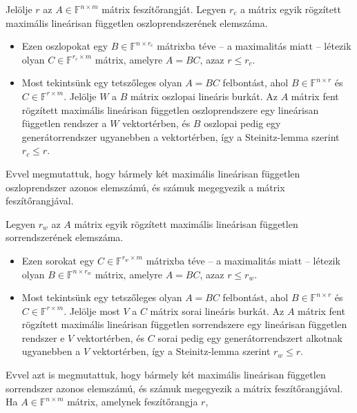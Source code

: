 \documentclass[a4paper, showtrims]{memoir}
\makeatletter
\renewenvironment{proof}[1][\proofname]
    {\par\pushQED{\qed}%
    \normalfont \topsep6\p@\@plus6\p@\relax
    \trivlist
    \item[\hskip\labelsep
        \itshape
    #1\@addpunct{:}]\ignorespaces}
    {\popQED\endtrivlist\@endpefalse}
\theoremstyle{plain}
\theoremstyle{remark}
\theoremstyle{definition}
\makeatother
\begin{document}
\begin{proof}
	Jelölje $r$ az $A\in\mathbb{F}^{n\times m}$ mátrix feszítőrangját.
	Legyen $r_c$ a mátrix egyik rögzített maximális lineárisan független oszloprendszerének elemszáma.
	\begin{itemize}
		\item
		      Ezen oszlopokat egy $B\in\mathbb{F}^{n\times r_c}$ mátrixba téve
		      -- a maximalitás miatt -- létezik olyan $C\in\mathbb{F}^{r_c\times m}$ mátrix,
		      amelyre $A=BC$, azaz $r\leq r_c$.
		\item
		      Most tekintsünk egy tetszőleges olyan
		      \(
		      A=BC
		      \)
		      felbontást,
		      ahol $B\in\mathbb{F}^{n\times r}$ és $C\in\mathbb{F}^{r\times m}$.
		      Jelölje $W$ a $B$ mátrix oszlopai lineáris burkát.
		      Az $A$ mátrix fent rögzített maximális lineárisan független oszloprendszere egy lineárisan független rendszer a
		      $W$ vektortérben,
		      és $B$ oszlopai pedig egy generátorrendszer ugyanebben a vektortérben,
		      így a Steinitz-lemma  szerint $r_c\leq r$.
	\end{itemize}
	Evvel megmutattuk, hogy bármely két maximális lineárisan független oszloprendszer azonos elemszámú, és számuk megegyezik a mátrix feszítőrangjával.


	Legyen $r_w$ az $A$ mátrix egyik rögzített maximális lineárisan független sorrendszerének elemszáma.
	\begin{itemize}
		\item
		      Ezen sorokat egy $C\in\mathbb{F}^{r_w\times m}$ mátrixba téve
		      -- a maximalitás miatt -- létezik olyan $B\in\mathbb{F}^{n\times r_w}$ mátrix,
		      amelyre $A=BC$, azaz $r\leq r_w$.
		\item
		      Most tekintsünk egy tetszőleges olyan
		      \(
		      A=BC
		      \)
		      felbontást,
		      ahol $B\in\mathbb{F}^{n\times r}$ és $C\in\mathbb{F}^{r\times m}$.
		      Jelölje most $V$ a $C$ mátrix sorai lineáris burkát.
		      Az $A$ mátrix fent rögzített maximális lineárisan független sorrendszere egy lineárisan független rendszer e
		      $V$ vektortérben,
		      és $C$ sorai pedig egy generátorrendszert alkotnak ugyanebben a $V$ vektortérben,
		      így a Steinitz-lemma szerint $r_w\leq r$.
	\end{itemize}
	Evvel azt is megmutattuk,
	hogy bármely két maximális lineárisan független sorrendszer azonos elemszámú,
	és számuk megegyezik a mátrix feszítőrangjával.
\end{proof}
Ha $A\in\mathbb{F}^{n\times m}$ mátrix, amelynek feszítőrangja $r$,
\end{document}
